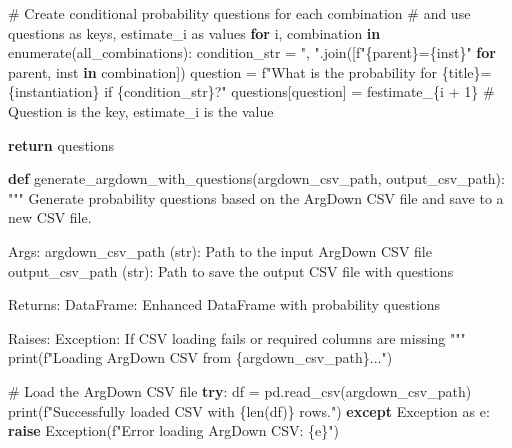 \documentclass[
  11pt,
  letterpaper,
]{book}
\newenvironment{Shaded}{\begin{snugshade}}{\end{snugshade}}
\newcommand{\BuiltInTok}[1]{\textcolor[rgb]{0.00,0.23,0.31}{#1}}
\newcommand{\CommentTok}[1]{\textcolor[rgb]{0.37,0.37,0.37}{#1}}
\newcommand{\ControlFlowTok}[1]{\textcolor[rgb]{0.00,0.23,0.31}{\textbf{#1}}}
\newcommand{\DecValTok}[1]{\textcolor[rgb]{0.68,0.00,0.00}{#1}}
\newcommand{\ImportTok}[1]{\textcolor[rgb]{0.00,0.46,0.62}{#1}}
\newcommand{\KeywordTok}[1]{\textcolor[rgb]{0.00,0.23,0.31}{\textbf{#1}}}
\newcommand{\NormalTok}[1]{\textcolor[rgb]{0.00,0.23,0.31}{#1}}
\newcommand{\OperatorTok}[1]{\textcolor[rgb]{0.37,0.37,0.37}{#1}}
\newcommand{\PreprocessorTok}[1]{\textcolor[rgb]{0.68,0.00,0.00}{#1}}
\newcommand{\SpecialCharTok}[1]{\textcolor[rgb]{0.37,0.37,0.37}{#1}}
\newcommand{\SpecialStringTok}[1]{\textcolor[rgb]{0.13,0.47,0.30}{#1}}
\newcommand{\StringTok}[1]{\textcolor[rgb]{0.13,0.47,0.30}{#1}}
\begin{document}
\begin{Shaded}
\begin{Highlighting}[]
    \CommentTok{\# Create conditional probability questions for each combination}
    \CommentTok{\# and use questions as keys, estimate\_i as values}
    \ControlFlowTok{for}\NormalTok{ i, combination }\KeywordTok{in} \BuiltInTok{enumerate}\NormalTok{(all\_combinations):}
\NormalTok{        condition\_str }\OperatorTok{=} \StringTok{", "}\NormalTok{.join([}\SpecialStringTok{f"}\SpecialCharTok{\{}\NormalTok{parent}\SpecialCharTok{\}}\SpecialStringTok{=}\SpecialCharTok{\{}\NormalTok{inst}\SpecialCharTok{\}}\SpecialStringTok{"} \ControlFlowTok{for}\NormalTok{ parent, inst }\KeywordTok{in}\NormalTok{ combination])}
\NormalTok{        question }\OperatorTok{=} \SpecialStringTok{f"What is the probability for }\SpecialCharTok{\{}\NormalTok{title}\SpecialCharTok{\}}\SpecialStringTok{=}\SpecialCharTok{\{}\NormalTok{instantiation}\SpecialCharTok{\}}\SpecialStringTok{ if }\SpecialCharTok{\{}\NormalTok{condition\_str}\SpecialCharTok{\}}\SpecialStringTok{?"}
\NormalTok{        questions[question] }\OperatorTok{=} \SpecialStringTok{f\textquotesingle{}estimate\_}\SpecialCharTok{\{}\NormalTok{i }\OperatorTok{+} \DecValTok{1}\SpecialCharTok{\}}\SpecialStringTok{\textquotesingle{}}  \CommentTok{\# Question is the key, estimate\_i is the value}

    \ControlFlowTok{return}\NormalTok{ questions}


\KeywordTok{def}\NormalTok{ generate\_argdown\_with\_questions(argdown\_csv\_path, output\_csv\_path):}
    \CommentTok{"""}
\CommentTok{    Generate probability questions based on the ArgDown CSV file and save to a new CSV file.}

\CommentTok{    Args:}
\CommentTok{        argdown\_csv\_path (str): Path to the input ArgDown CSV file}
\CommentTok{        output\_csv\_path (str): Path to save the output CSV file with questions}

\CommentTok{    Returns:}
\CommentTok{        DataFrame: Enhanced DataFrame with probability questions}

\CommentTok{    Raises:}
\CommentTok{        Exception: If CSV loading fails or required columns are missing}
\CommentTok{    """}
    \BuiltInTok{print}\NormalTok{(}\SpecialStringTok{f"Loading ArgDown CSV from }\SpecialCharTok{\{}\NormalTok{argdown\_csv\_path}\SpecialCharTok{\}}\SpecialStringTok{..."}\NormalTok{)}

    \CommentTok{\# Load the ArgDown CSV file}
    \ControlFlowTok{try}\NormalTok{:}
\NormalTok{        df }\OperatorTok{=}\NormalTok{ pd.read\_csv(argdown\_csv\_path)}
        \BuiltInTok{print}\NormalTok{(}\SpecialStringTok{f"Successfully loaded CSV with }\SpecialCharTok{\{}\BuiltInTok{len}\NormalTok{(df)}\SpecialCharTok{\}}\SpecialStringTok{ rows."}\NormalTok{)}
    \ControlFlowTok{except} \PreprocessorTok{Exception} \ImportTok{as}\NormalTok{ e:}
        \ControlFlowTok{raise} \PreprocessorTok{Exception}\NormalTok{(}\SpecialStringTok{f"Error loading ArgDown CSV: }\SpecialCharTok{\{}\NormalTok{e}\SpecialCharTok{\}}\SpecialStringTok{"}\NormalTok{)}


\end{Highlighting}
\end{Shaded}
\end{document}
